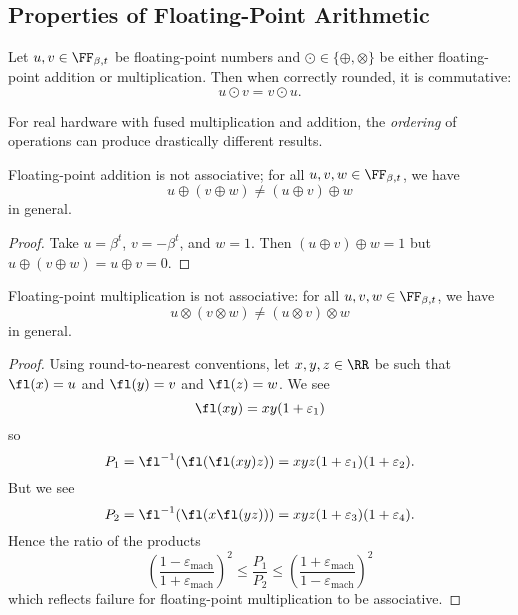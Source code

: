 \subsection{Properties of Floating-Point Arithmetic}
\begin{thm}
  Let $u,v\in\FF_{\beta,t}$ be floating-point numbers and
  $\odot\in\{\oplus,\otimes\}$ be either floating-point addition or
  multiplication. Then when correctly rounded, it is commutative:
  \begin{equation}
    u\odot v = v\odot u.
  \end{equation}
\end{thm}

\begin{rmk}
For real hardware with fused multiplication and addition, the
\emph{ordering} of operations can produce drastically different results.
\end{rmk}

\begin{thm}
  Floating-point addition is not associative;
  for all $u,v,w\in\FF_{\beta,t}$, we have
  $$u\oplus(v\oplus w) \neq (u\oplus v)\oplus w$$
  in general.
\end{thm}
\begin{proof}
  Take $u=\beta^{t}$, $v=-\beta^{t}$, and $w=1$. Then $(u\oplus v)\oplus w=1$
  but $u\oplus(v\oplus w)=u\oplus v=0$.
\end{proof}

\begin{thm}
  Floating-point multiplication is not associative:
  for all $u,v,w\in\FF_{\beta,t}$, we have
  $$u\otimes(v\otimes w) \neq (u\otimes v)\otimes w$$
  in general.
\end{thm}
\begin{proof}
  Using round-to-nearest conventions, let $x,y,z\in\RR$ be such that
  $\fl(x)=u$ and $\fl(y)=v$ and $\fl(z)=w$. We see
  \begin{equation}
    \fl(xy) = xy(1 + \varepsilon_{1})
  \end{equation}
  so
  \begin{equation}
    P_{1}=\fl^{-1}(\fl(\fl(xy)z)) = xyz(1+\varepsilon_{1})(1 + \varepsilon_{2}).
  \end{equation}
  But we see
  \begin{equation}
    P_{2}=\fl^{-1}(\fl(x\fl(yz))) = xyz(1+\varepsilon_{3})(1 + \varepsilon_{4}).
  \end{equation}
  Hence the ratio of the products
  \begin{equation}
    \left(\frac{1 - \varepsilon_{\text{mach}}}{1 + \varepsilon_{\text{mach}}}\right)^{2}\leq\frac{P_{1}}{P_{2}}\leq\left(\frac{1 + \varepsilon_{\text{mach}}}{1 - \varepsilon_{\text{mach}}}\right)^{2}
  \end{equation}
  which reflects failure for floating-point multiplication to be associative.
\end{proof}